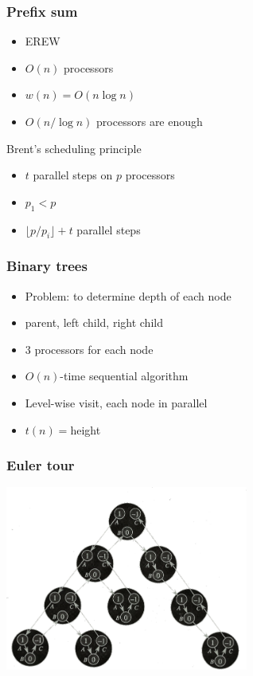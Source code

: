 \documentclass[14pt]{beamer}
\begin{document}
\begin{frame}\frametitle{Prefix sum}
  \begin{itemize}
  \item
    EREW
  \item
    $O(n)$ processors
  \item
    $w(n) = O(n\log n)$
  \item
    $O(n/\log n)$ processors are enough
  \end{itemize}

\begin{block}{Brent's scheduling principle}
  \begin{itemize}
  \item
    $t$ parallel steps on $p$ processors
  \item
    $p_{1}<p$
  \item
    $\lfloor p/p_{i}\rfloor +t$ parallel steps
  \end{itemize}
\end{block}
\end{frame}



\begin{frame}\frametitle{Binary trees}
  \begin{itemize}
  \item
    Problem: to determine depth of each node
  \item
    parent, left child, right child
  \item
    $3$ processors for each node
  \item
    $O(n)$-time sequential algorithm
  \item
    Level-wise visit, each node in parallel
  \item
    $t(n)=$height
  \end{itemize}
\end{frame}


\begin{frame}\frametitle{Euler tour}
  \begin{center}
    \includegraphics[width=8cm]{euler1.png}
  \end{center}

\end{frame}
\end{document}
